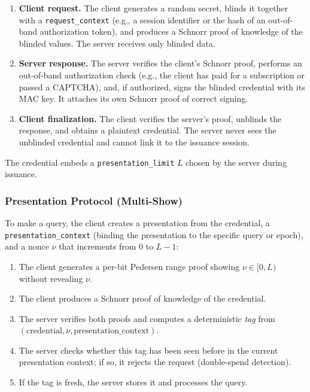 \begin{enumerate}[nolistsep,leftmargin=*]
    \item \textbf{Client request.} The client generates a random secret, blinds it together with a \texttt{request\_context} (e.g., a session identifier or the hash of an out-of-band authorization token), and produces a Schnorr proof of knowledge of the blinded values. The server receives only blinded data.
    \item \textbf{Server response.} The server verifies the client's Schnorr proof, performs an out-of-band authorization check (e.g., the client has paid for a subscription or passed a CAPTCHA), and, if authorized, signs the blinded credential with its MAC key. It attaches its own Schnorr proof of correct signing.
    \item \textbf{Client finalization.} The client verifies the server's proof, unblinds the response, and obtains a plaintext credential. The server never sees the unblinded credential and cannot link it to the issuance session.
\end{enumerate}

The credential embeds a \texttt{presentation\_limit} $L$ chosen by the server during issuance.

\subsubsection{Presentation Protocol (Multi-Show)}

To make a query, the client creates a presentation from the credential, a \texttt{presentation\_context} (binding the presentation to the specific query or epoch), and a nonce $\nu$ that increments from $0$ to $L-1$:

\begin{enumerate}[nolistsep,leftmargin=*]
    \item The client generates a per-bit Pedersen range proof showing $\nu \in [0, L)$ without revealing $\nu$.
    \item The client produces a Schnorr proof of knowledge of the credential.
    \item The server verifies both proofs and computes a deterministic \emph{tag} from $(\text{credential}, \nu, \text{presentation\_context})$.
    \item The server checks whether this tag has been seen before in the current presentation context; if so, it rejects the request (double-spend detection).
    \item If the tag is fresh, the server stores it and processes the query.
\end{enumerate}

